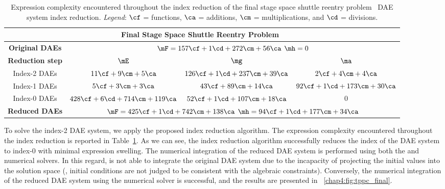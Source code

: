 \begin{table}
  \caption{Expression complexity encountered throughout the index reduction of the final stage space shuttle reentry problem~\cite{brenan1995numerical} \ac{DAE} system index reduction. \emph{Legend}: $\cf$ = functions, $\ca$ = additions, $\cm$ = multiplications, and $\cd$ = divisions.}
  \label{chap4:tab:tppc_final}
  \centering
  {\footnotesize\begin{tabular}{cccc}
    \multicolumn{4}{c}{\textbf{Final Stage Space Shuttle Reentry Problem~\cite{brenan1995numerical}}} \\
    \toprule
    \textbf{Original \acp{DAE}} & \multicolumn{3}{c}{$\mF = 157\cf + 1\cd + 272\cm + 56\ca$ \quad $\mh = 0$} \\
    \midrule
    \textbf{Reduction step} & $\mE$ & $\mg$ & $\ma$ \\
    \midrule
    Index-2 \acp{DAE} & $11\cf + 9\cm + 5\ca$ & $126\cf + 1\cd + 237\cm + 39\ca$ & $2\cf + 4\cm + 4\ca$ \\
    Index-1 \acp{DAE} & $5\cf + 3\cm + 3\ca$ & $43\cf + 89\cm + 14\ca$ & $92\cf + 1\cd + 173\cm + 30\ca$ \\
    Index-0 \acp{DAE} & $428\cf + 6\cd + 714\cm + 119\ca$ & $52\cf + 1\cd + 107\cm + 18\ca$ & $0$ \\
    \midrule
    \textbf{Reduced \acp{DAE}} & \multicolumn{3}{c}{$\mF = 425\cf + 1\cd + 742\cm + 138\ca$ \quad $\mh = 94\cf + 1\cd + 177\cm + 34\ca$} \\
    \bottomrule
  \end{tabular}}
\end{table}

To solve the index-2 \ac{DAE} system, we apply the proposed index reduction algorithm. The expression complexity encountered throughout the index reduction is reported in Table~\ref{chap4:tab:tppc_final}. As we can see, the index reduction algorithm successfully reduces the index of the \ac{DAE} system to index-0 with minimal expression swelling. The numerical integration of the reduced \ac{DAE} system is performed using both the \Maple{} and \Indigo{} numerical solvers. In this regard, \Maple{} is not able to integrate the original \ac{DAE} system due to the incapacity of projecting the initial values into the solution space (\ie{}, initial conditions are not judged to be consistent with the algebraic constraints). Conversely, the numerical integration of the reduced \ac{DAE} system using the \Indigo{} numerical solver is successful, and the results are presented in \figurename~\ref{chap4:fig:tppc_final}.

